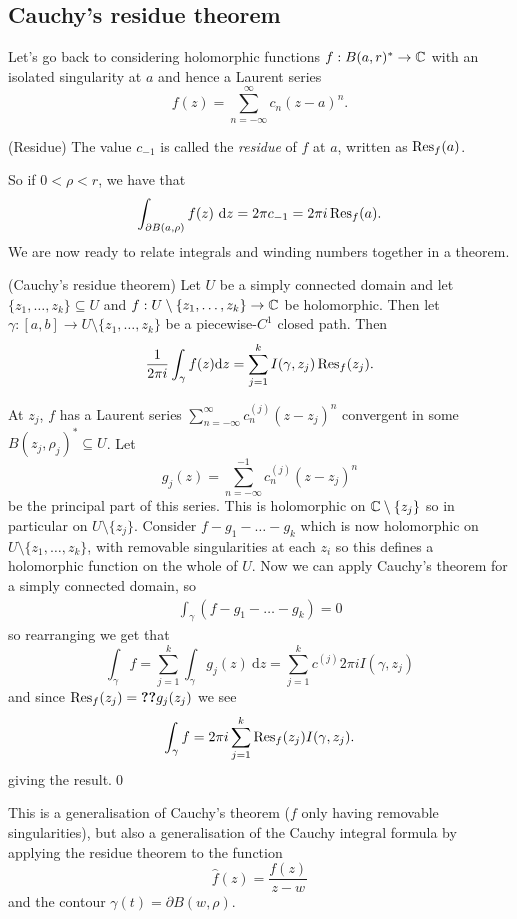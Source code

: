 \documentclass{article}
\begin{document}
\subsection{Cauchy's residue theorem}
Let's go back to considering holomorphic functions $ f:B(a,r)^* \to \mathbb{C} $ with an isolated singularity at $ a $ and hence a Laurent series
\[
	f(z) =\sum_{n=-\infty}^\infty c_n(z-a)^n.
\]
\begin{definition}
	(Residue) The value $ c_{-1} $ is called the \textit{residue} of $ f $ at $ a $, written as $ \Res_f(a) $.
\end{definition}
So if $ 0<\rho <r $, we have that
\[
\int_{\partial B(a,\rho)} f(z) \ \mathrm dz = 2\pi c_{-1} = 2\pi i \Res_f(a).
\]
We are now ready to relate integrals and winding numbers together in a theorem.
\begin{theorem}
	(Cauchy's residue theorem) Let $ U $ be a simply connected domain and let $ \{z_1,\dots, z_k\} \subseteq U$ and $ f:U\setminus \{z_1,\dots, z_k\}\to \mathbb{C} $ be holomorphic. Then let $ \gamma:[a,b]\to U\setminus \{z_1,\dots, z_k\} $ be a piecewise-$ C^1 $ closed path. Then
	\[
		\frac 1{2\pi i} \int_\gamma f(z) \mathrm dz = \sum_{j=1}^k I(\gamma,z_j) \Res_f(z_j).
	\]
\end{theorem} 
\pf At $ z_j $, $ f $ has a Laurent series $ \sum_{n=-\infty}^\infty c_n^{(j)} (z-z_j)^n $ convergent in some $ B(z_j,\rho_j)^*\subseteq U $. Let
\[
	g_j(z) = \sum_{n=-\infty}^{-1} c_n^{(j)}(z-z_j)^n
\]
be the principal part of this series. This is holomorphic on $ \mathbb{C}\setminus \{z_j\} $ so in particular on $ U\setminus \{z_j\} $. Consider $ f-g_1-\dots-g_k $ which is now holomorphic on $ U\setminus \{z_1,\dots, z_k\} $, with removable singularities at each $ z_i $ so this defines a holomorphic function on the whole of $ U $. Now we can apply Cauchy's theorem for a simply connected domain, so
\begin{align*}
  \int_\gamma (f-g_1-\dots -g_k) = 0
\end{align*}
so rearranging we get that
\[
\int_\gamma f = \sum_{j=1}^k \int_\gamma g_j(z)\ \mathrm dz = \sum_{j=1}^k c^{(j)}2\pi iI(\gamma,z_j)
\]
and since $ \Res_f(z_j) =\Ref_{g_j}(z_j) $ we see
\[
	\int_\gamma f = 2\pi i \sum_{j=1}^k \Res_f(z_j)I(\gamma,z_j).
\]
giving the result.\qed
\begin{remark}
  This is a generalisation of Cauchy's theorem ($ f $ only having removable singularities), but also a generalisation of the Cauchy integral formula by applying the residue theorem to the function
  \[
	  \hat f(z) = \frac{f(z)}{z-w}
  \]
  and the contour $ \gamma(t) = \partial B(w,\rho) $.
\end{remark}
\end{document}
